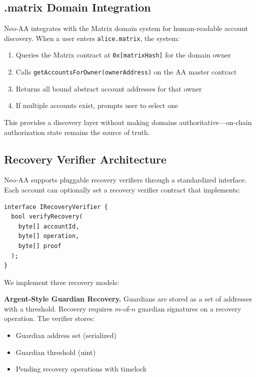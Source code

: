 \documentclass[10pt,twocolumn]{article}
\newcommand{\code}[1]{\texttt{\small #1}}
\begin{document}
\subsection{.matrix Domain Integration}

Neo-AA integrates with the Matrix domain system for human-readable account discovery. When a user enters \code{alice.matrix}, the system:

\begin{enumerate}[leftmargin=*,topsep=2pt,itemsep=1pt]
\item Queries the Matrix contract at \code{0x[matrixHash]} for the domain owner
\item Calls \code{getAccountsForOwner(ownerAddress)} on the AA master contract
\item Returns all bound abstract account addresses for that owner
\item If multiple accounts exist, prompts user to select one
\end{enumerate}

This provides a discovery layer without making domains authoritative—on-chain authorization state remains the source of truth.

\subsection{Recovery Verifier Architecture}

Neo-AA supports pluggable recovery verifiers through a standardized interface. Each account can optionally set a recovery verifier contract that implements:

\begin{verbatim}
interface IRecoveryVerifier {
  bool verifyRecovery(
    byte[] accountId,
    byte[] operation,
    byte[] proof
  );
}
\end{verbatim}

We implement three recovery models:

\textbf{Argent-Style Guardian Recovery.} Guardians are stored as a set of addresses with a threshold. Recovery requires $m$-of-$n$ guardian signatures on a recovery operation. The verifier stores:
\begin{itemize}[leftmargin=*,topsep=2pt,itemsep=1pt]
\item Guardian address set (serialized)
\item Guardian threshold (uint)
\item Pending recovery operations with timelock
\end{itemize}
\end{document}
